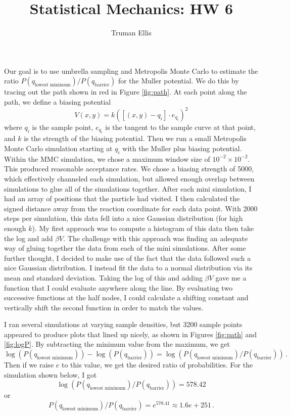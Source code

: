 \documentclass[letterpaper]{article}
\title{Statistical Mechanics: HW 6}
\author{Truman Ellis}
\begin{document}
\maketitle
Our goal is to use umbrella sampling and Metropolis Monte Carlo to estimate the
ratio $P(q_{\text{lowest minimum}})/P(q_{\text{barrier}})$ for the Muller
potential. We do this by tracing out the path shown in red in Figure
\ref{fig:path}. At each point along the path, we define a biasing potential 
\[
V(x,y) = k([(x,y)-q_i]\cdot e_{q_i})^2
\]
where $q_i$ is the sample point, $e_{q_i}$ is the tangent to the sample curve at
that point, and $k$ is the strength of the biasing potential. Then we run a
small Metropolis Monte Carlo simulation starting at $q_i$ with the Muller plus
biasing potential. Within the MMC simulation, we chose a maximum window size of
$10^{-2}\times10^{-2}$. This produced reasonable acceptance rates. We chose a
biasing strength of 5000, which effectively channeled each simulation, but
allowed enough overlap between simulations to glue all of the simulations
together. After each mini simulation, I had an array of positions that the
particle had visited. I then calculated the signed distance away from the 
reaction coordinate for each data point. With 2000 steps per simulation, 
this data fell into a nice Gaussian distribution (for high enough $k$). My first
approach was to compute a histogram of this data then take the log and add
$\beta V$. The challenge with this approach was finding an adequate way of
gluing together the data from each of the mini simulations. After some further
thought, I decided to make use of the fact that the data followed such a nice
Gaussian distribution. I instead fit the data to a normal distribution via its
mean and standard deviation. Taking the log of this and adding $\beta V$ gave me
a function that I could evaluate anywhere along the line. By evaluating two
successive functions at the half nodes, I could calculate a shifting constant
and vertically shift the second function in order to match the values. 

I ran several simulations at varying sample densities, but 3200 sample points
appeared to produce plots that lined up nicely, as shown in Figures
\ref{fig:path} and \ref{fig:logP}. By subtracting the minimum value from the
maximum, we get 
\[
\log(P(q_{\text{lowest minimum}}))-\log(P(q_{\text{barrier}}))
=\log\left( P(q_{\text{lowest minimum}})/P(q_{\text{barrier}}) \right)\,.
\]
Then if we raise $e$ to this value, we get the desired ratio of probabilities.
For the simulation shown below, I got 
\[
\log( P(q_{\text{lowest minimum}})/P(q_{\text{barrier}})) = 578.42
\]
or 
\[
P(q_{\text{lowest minimum}})/P(q_{\text{barrier}}) = e^{578.41}\approx 1.6e+251\,.
\]
\end{document}
